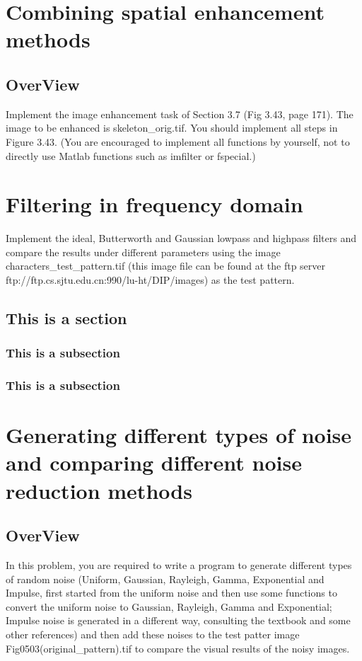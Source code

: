 \documentclass[11pt,oneside]{book}
\begin{document}
\chapter{Combining spatial enhancement methods}
\section{OverView}
   Implement the image enhancement task of Section 3.7 (Fig 3.43, page 171). The image to be enhanced is skeleton\_orig.tif. You should implement all steps in Figure 3.43. (You are encouraged to implement all functions by yourself, not to directly use Matlab functions such as imfilter or fspecial.)



\chapter{Filtering in frequency domain}
Implement the ideal, Butterworth and Gaussian lowpass and highpass filters and compare the results under different parameters using the image characters\_test\_pattern.tif (this image file can be found at the ftp server ftp://ftp.cs.sjtu.edu.cn:990/lu-ht/DIP/images) as the test pattern.

\section{This is a section}
\subsection{This is a subsection}
\lipsum[1-1]
\subsection{This is a subsection}
\lipsum[1-2]

\chapter{Generating different types of noise and comparing different noise reduction methods}
\section{OverView}
In this problem, you are required to write a program to generate different types of random noise (Uniform, Gaussian, Rayleigh, Gamma, Exponential and Impulse, first started from the uniform noise and then use some functions to convert the uniform noise to Gaussian, Rayleigh, Gamma and Exponential; Impulse noise is generated in a different way, consulting the textbook and some other references) and then add these noises to the test patter image Fig0503(original\_pattern).tif to compare the visual results of the noisy images.
\end{document}
